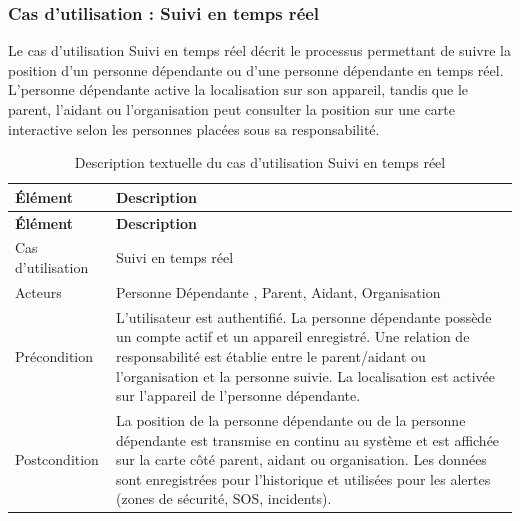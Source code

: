 \subsubsection{Cas d'utilisation : Suivi en temps réel}

Le cas d'utilisation \og Suivi en temps réel \fg{} décrit le processus permettant de suivre la position d’un personne dépendante ou d’une personne dépendante en temps réel. L’personne dépendante active la localisation sur son appareil, tandis que le parent, l’aidant ou l’organisation peut consulter la position sur une carte interactive selon les personnes placées sous sa responsabilité.

\small
\renewcommand{\arraystretch}{1.1}
\setlength{\parskip}{0pt}
\begin{longtable}{|p{}|>{\raggedright\arraybackslash}p{}|}
\caption{Description textuelle du cas d'utilisation Suivi en temps réel} \\ \hline
\textbf{Élément} & \textbf{Description} \\ \hline
\endfirsthead

\hline
\textbf{Élément} & \textbf{Description} \\ \hline
\endhead

\hline
\endlastfoot

Cas d'utilisation & Suivi en temps réel \\ \hline

Acteurs & Personne Dépendante , Parent, Aidant, Organisation \\ \hline

Précondition & 
L’utilisateur est authentifié. La personne dépendante possède un compte actif et un appareil enregistré. Une relation de responsabilité est établie entre le parent/aidant ou l’organisation et la personne suivie. La localisation est activée sur l’appareil de l’personne dépendante. \\ \hline

Postcondition & 
La position de la personne dépendante ou de la personne dépendante est transmise en continu au système et est affichée sur la carte côté parent, aidant ou organisation. Les données sont enregistrées pour l’historique et utilisées pour les alertes (zones de sécurité, SOS, incidents). \\ \hline


\end{longtable}
